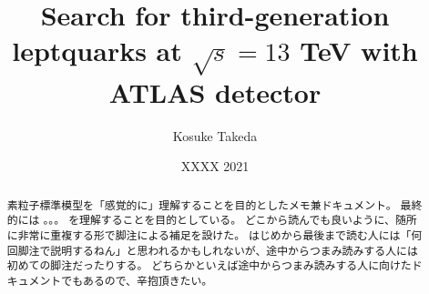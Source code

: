 \documentclass[a4paper,11pt,dvidpdfmx,uplatex]{jsreport}
\title{Search for third-generation leptquarks at $\sqrt{s}=13$ TeV with ATLAS detector}
\author{Kosuke Takeda}
\date{XXXX 2021}
\begin{document}
\maketitle

\begin{abstract}
  素粒子標準模型を「感覚的に」理解することを目的としたメモ兼ドキュメント。
  最終的には
  。。。
  を理解することを目的としている。
  どこから読んでも良いように、随所に非常に重複する形で脚注による補足を設けた。
  はじめから最後まで読む人には「何回脚注で説明するねん」と思われるかもしれないが、途中からつまみ読みする人には初めての脚注だったりする。
  どちらかといえば途中からつまみ読みする人に向けたドキュメントでもあるので、辛抱頂きたい。
\end{abstract}

















\appendix

\end{document}
